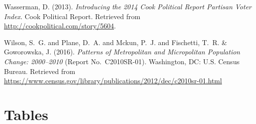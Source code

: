 \documentclass[draft,linenumbers]{agujournal}\usepackage{knitr}
\begin{document}
\begin{thebibliography}{33}
  Wasserman, D. (2013).
  \textit{Introducing the 2014 {C}ook {P}olitical {R}eport {P}artisan {V}oter
  {I}ndex}.
  Cook Political Report.
  Retrieved from
  \url{http://cookpolitical.com/story/5604}.

  Wilson, S.~G. and Plane, D.~A. and Mckun, P.~J. and Fischetti, T.~R. \&
  Goworowska, J. (2016).
  \textit{Patterns of Metropolitan and Micropolitan Population Change: 2000--2010\/}
  (Report No.~C2010SR-01).
  Washington, DC:  U.S. Census Bureau.
  Retrieved from
  \url{https://www.census.gov/library/publications/2012/dec/c2010sr-01.html}

\end{thebibliography}

%
%
\clearpage
\section*{Tables}
\end{document}

